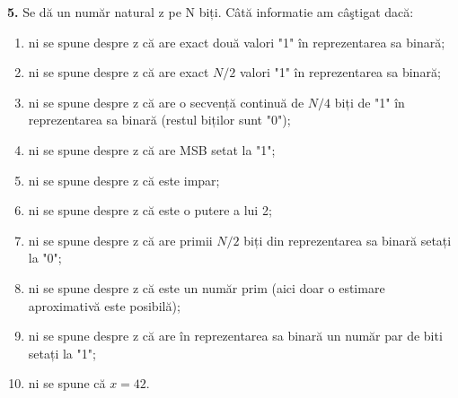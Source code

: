\documentclass[a4paper]{article}
\begin{document}
\textbf{5.} Se dă un număr natural z pe N biți. Câtă informatie am câştigat dacă:
\begin{enumerate}[label=(\alph*)]
\item ni se spune despre z că are exact două valori "1" în reprezentarea sa binară;
\item ni se spune despre z că are exact $N/2$ valori "1" în reprezentarea sa binară;
\item ni se spune despre z că are o secvență continuă de $N/4$ biți de "1" în reprezentarea sa binară
(restul biților sunt "0");
\item ni se spune despre z că are MSB setat la "1";
\item ni se spune despre z că este impar;
\item ni se spune despre z că este o putere a lui 2;
\item ni se spune despre z că are primii $N/2$ biți din reprezentarea sa binară setați la "0";
\item ni se spune despre z că este un număr prim (aici doar o estimare aproximativă este posibilă);
\item ni se spune despre z că are în reprezentarea sa binară un număr par de biti setați la "1";
\item ni se spune că $x=42$.
\end{enumerate}
\end{document}
